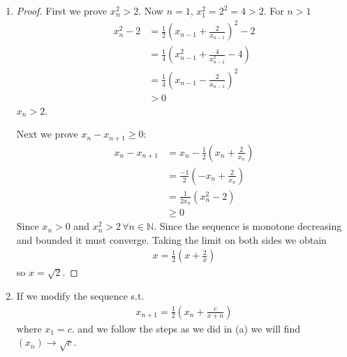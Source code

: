 \begin{enumerate}[label=(\alph*)]
    \item 
    \begin{proof}
        First we prove $x_n^2 > 2$. Now $n=1$, $x_1^2=2^2 = 4 > 2$.
        For $n > 1$
        \begin{align*}
            x_n^2 - 2 &= \frac{1}{2}\left( x_{n-1} + \frac{2}{x_{n-1}} \right)^2 - 2 \\
                    &= \frac{1}{4} \left( x_{n-1}^2 + \frac{4}{x_{n-1}^2} - 4 \right) \\
                    &= \frac{1}{4}\left( x_{n-1} - \frac{2}{x_{n-1}} \right)^2 \\
                    &> 0
        \end{align*}
        $x_{n} > 2$.

        Next we prove $x_n - x_{n+1} \geq 0$:
        \begin{align*}
            x_n - x_{n+1} &= x_n - \frac{1}{2}\left( x_n + \frac{2}{x_n} \right) \\
                        &= \frac{-1}{2}\left( -x_n + \frac{2}{x_n} \right) \\
                        &= \frac{1}{2x_n}\left( x_n^2 - 2 \right) \\
                        &\geq 0
        \end{align*}
        Since $x_n > 0$ and $x_n^2 > 2 \, \forall n \in \mathbb{N}$.
        Since the sequence is monotone decreasing and bounded it must converge.
        Taking the limit on both sides we obtain
        \begin{align*}
            x = \frac{1}{2}\left( x + \frac{2}{x} \right)
        \end{align*}
        so $x = \sqrt 2$.
    \end{proof}

    \item 
    If we modify the sequence s.t. 
    \begin{align*}
        x_{n+1} = \frac{1}{2}\left( x_n + \frac{c}{x+n}\right)
    \end{align*}
    where $x_1=c$.
    and we follow the steps as we did in (a) we will find $(x_n) \rightarrow \sqrt c$.
\end{enumerate}


